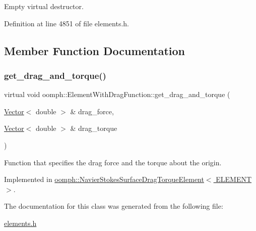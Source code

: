 Empty virtual destructor. 



Definition at line 4851 of file elements.\+h.



\subsection{Member Function Documentation}
\mbox{\label{classoomph_1_1ElementWithDragFunction_a25eba94e85107e4361476861af2ef274}} 
\subsubsection{\texorpdfstring{get\+\_\+drag\+\_\+and\+\_\+torque()}{get\_drag\_and\_torque()}}
{\footnotesize\ttfamily virtual void oomph\+::\+Element\+With\+Drag\+Function\+::get\+\_\+drag\+\_\+and\+\_\+torque (\begin{DoxyParamCaption}\item[{\hyperlink{classoomph_1_1Vector}{Vector}$<$ double $>$ \&}]{drag\+\_\+force,  }\item[{\hyperlink{classoomph_1_1Vector}{Vector}$<$ double $>$ \&}]{drag\+\_\+torque }\end{DoxyParamCaption})\hspace{0.3cm}{\ttfamily [pure virtual]}}



Function that specifies the drag force and the torque about the origin. 



Implemented in \hyperlink{classoomph_1_1NavierStokesSurfaceDragTorqueElement_a3772165689b96fc7206d2a7c6da3a200}{oomph\+::\+Navier\+Stokes\+Surface\+Drag\+Torque\+Element$<$ E\+L\+E\+M\+E\+N\+T $>$}.



The documentation for this class was generated from the following file\+:\begin{DoxyCompactItemize}
\item 
\hyperlink{elements_8h}{elements.\+h}\end{DoxyCompactItemize}
